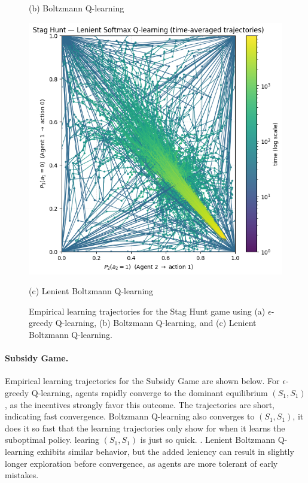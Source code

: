 \begin{figure}[h]
\begin{minipage}{0.32\textwidth}
        \caption*{(b) Boltzmann Q-learning}
    \end{minipage}
    \hfill
    \begin{minipage}{0.32\textwidth}
        \centering
        \includegraphics[width=\linewidth]{figures/task-2/learning/stag_hunt_lenient.png}
        \caption*{(c) Lenient Boltzmann Q-learning}
    \end{minipage}
    \caption{Empirical learning trajectories for the Stag Hunt game using (a) $\epsilon$-greedy Q-learning, (b) Boltzmann Q-learning, and (c) Lenient Boltzmann Q-learning.}
\end{figure}


\paragraph{Subsidy Game.}


Empirical learning trajectories for the Subsidy Game are shown below. For $\epsilon$-greedy Q-learning, agents rapidly converge to the dominant equilibrium $(S_1, S_1)$, as the incentives strongly favor this outcome. The trajectories are short, indicating fast convergence. Boltzmann Q-learning also converges to $(S_1, S_1)$, it does it so fast that the learning trajectories only show for when it learns the suboptimal policy. learing $(S_1, S_1)$ is just so quick. . Lenient Boltzmann Q-learning exhibits similar behavior, but the added leniency can result in slightly longer exploration before convergence, as agents are more tolerant of early mistakes.

